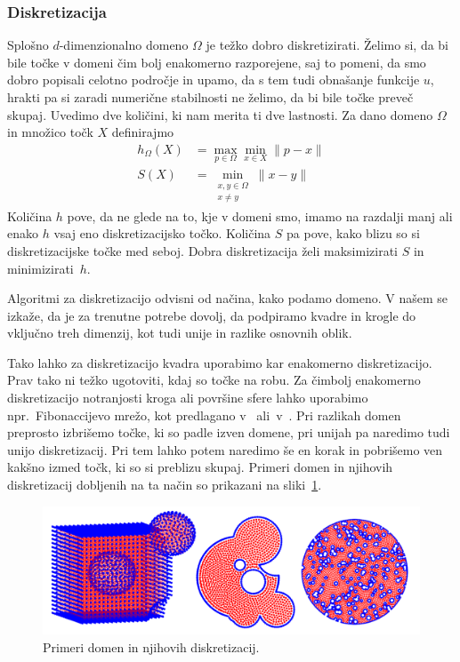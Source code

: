 \documentclass[12pt,a4paper]{article}
\theoremstyle{definition} %
\theoremstyle{plain} %
\numberwithin{equation}{section}
\begin{document}
\subsubsection{Diskretizacija}
Splošno $d$-dimenzionalno domeno $\Omega$ je težko dobro diskretizirati.
Želimo si, da bi bile točke v domeni čim bolj enakomerno razporejene, saj to
pomeni, da smo dobro popisali celotno področje in upamo, da s tem tudi obnašanje
funkcije $u$, hrakti pa si zaradi numerične stabilnosti ne želimo, da bi bile
točke preveč skupaj. Uvedimo dve količini, ki nam merita ti dve lastnosti.
Za dano domeno $\Omega$ in množico točk $X$ definirajmo
\begin{align}
  h_\Omega(X) &= \max_{p \in \Omega} \min_{x \in X} \|p - x\| \\
  \label{eq:def-hs}
  S(X) &= \min_{\substack{x, y \in \Omega \\ x \neq y}} \|x-y\| \nonumber
\end{align}
Količina $h$ pove, da ne glede na to, kje v domeni smo, imamo na razdalji manj ali enako $h$
vsaj eno diskretizacijsko točko. Količina $S$ pa pove, kako blizu so si
diskretizacijske točke med seboj. Dobra diskretizacija želi maksimizirati $S$ in
minimizirati~$h$.

Algoritmi za diskretizacijo odvisni od načina, kako podamo domeno.
V našem se izkaže, da je za trenutne potrebe dovolj, da podpiramo
kvadre in krogle do vključno treh dimenzij, kot tudi unije in razlike
osnovnih oblik.

Tako lahko za diskretizacijo kvadra uporabimo kar enakomerno diskretizacijo.
Prav tako ni težko ugotoviti, kdaj so točke na robu. Za čimbolj enakomerno
diskretizacijo notranjosti kroga ali površine sfere
lahko uporabimo npr.~Fibonaccijevo mrežo, kot predlagano
v~\cite{hannay2004fibonacci} ali~v~\cite{gonzalez2010measurement}.
Pri razlikah domen preprosto izbrišemo točke, ki so padle izven domene,
pri unijah pa naredimo tudi unijo diskretizacij. Pri tem lahko potem naredimo še
en korak in pobrišemo ven kakšno izmed točk, ki so si preblizu skupaj.
Primeri domen in njihovih diskretizacij dobljenih na ta način so prikazani na sliki~\ref{fig:domains}.
\begin{figure}[!ht]
  \centering
  \includegraphics[width=\textwidth]{images/domains_generated.png}
  \caption{Primeri domen in njihovih diskretizacij.}
  \label{fig:domains}
\end{figure}
\end{document}
